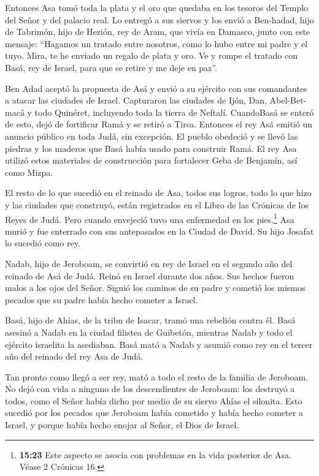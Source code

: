  Entonces Asa tomó toda la plata y el oro que quedaba en
los tesoros del Templo del Señor y del palacio real. Lo entregó a sus
siervos y los envió a Ben-hadad, hijo de Tabrimón, hijo de Hezión, rey
de Aram, que vivía en Damasco, junto con este mensaje: 
``Hagamos un tratado entre nosotros, como lo hubo entre mi padre y el
tuyo. Mira, te he enviado un regalo de plata y oro. Ve y rompe el
tratado con Basá, rey de Israel, para que se retire y me deje en paz''.

 Ben Adad aceptó la propuesta de Asá y envió a su ejército
con sus comandantes a atacar las ciudades de Israel. Capturaron las
ciudades de Ijón, Dan, Abel-Bet-macá y todo Quinéret, incluyendo toda la
tierra de Neftalí.  CuandoBasá se enteró de esto, dejó de
fortificar Ramá y se retiró a Tirsa.  Entonces el rey Asá
emitió un anuncio público en toda Judá, sin excepción. El pueblo
obedeció y se llevó las piedras y los maderos que Basá había usado para
construir Ramá. El rey Asa utilizó estos materiales de construcción para
fortalecer Geba de Benjamín, así como Mizpa.

 El resto de lo que sucedió en el reinado de Asa, todos sus
logros, todo lo que hizo y las ciudades que construyó, están registrados
en el Libro de las Crónicas de los Reyes de Judá. Pero cuando envejeció
tuvo una enfermedad en los pies.\footnote{\textbf{15:23} Este aspecto se
  asocia con problemas en la vida posterior de Asa. Véase 2 Crónicas 16.}
 Asa murió y fue enterrado con sus antepasados en la Ciudad
de David. Su hijo Josafat lo sucedió como rey.

 Nadab, hijo de Jeroboam, se convirtió en rey de Israel en
el segundo año del reinado de Asá de Judá. Reinó en Israel durante dos
años.  Sus hechos fueron malos a los ojos del Señor. Siguió
los caminos de su padre y cometió los mismos pecados que su padre había
hecho cometer a Israel.

 Basá, hijo de Ahías, de la tribu de Isacar, tramó una
rebelión contra él. Basá asesinó a Nadab en la ciudad filistea de
Guibetón, mientras Nadab y todo el ejército israelita la asediaban.
 Basá mató a Nadab y asumió como rey en el tercer año del
reinado del rey Asa de Judá.

 Tan pronto como llegó a ser rey, mató a todo el resto de
la familia de Jeroboam. No dejó con vida a ninguno de los descendientes
de Jeroboam: los destruyó a todos, como el Señor había dicho por medio
de su siervo Ahías el silonita.  Esto sucedió por los
pecados que Jeroboam había cometido y había hecho cometer a Israel, y
porque había hecho enojar al Señor, el Dios de Israel.

